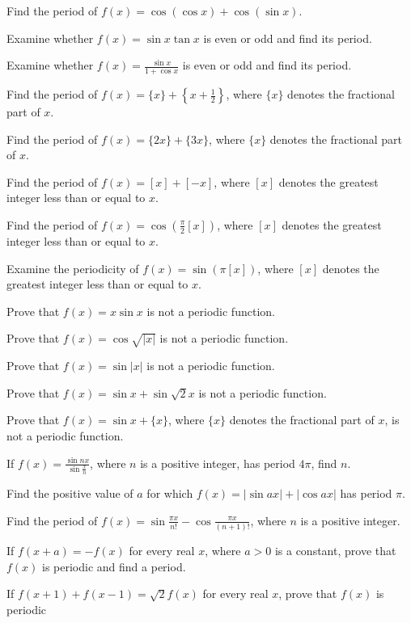 \item Find the period of $f(x) = \cos(\cos x) + \cos(\sin x)$.
\item Examine whether $f(x) = \sin x\tan x$ is even or odd and find its period.
\item Examine whether $f(x) = \frac{\sin x}{1 + \cos x}$ is even or odd and find its period.
\item Find the period of $f(x) = \{x\} + \left\{x + \frac{1}{2}\right\}$, where $\{x\}$ denotes the
  fractional part of $x$.
\item Find the period of $f(x) = \{2x\} + \{3x\}$, where $\{x\}$ denotes the fractional part of $x$.
\item Find the period of $f(x) = [x] + [-x]$, where $[x]$ denotes the greatest integer less than or
  equal to $x$.
\item Find the period of $f(x) = \cos\left(\frac{\pi}{2}[x]\right)$, where $[x]$ denotes the greatest
  integer less than or equal to $x$.
\item Examine the periodicity of $f(x) = \sin(\pi[x])$, where $[x]$ denotes the greatest integer
  less than or equal to $x$.
\item Prove that $f(x) = x\sin x$ is not a periodic function.
\item Prove that $f(x) = \cos\sqrt{|x|}$ is not a periodic function.
\item Prove that $f(x) = \sin|x|$ is not a periodic function.
\item Prove that $f(x) = \sin x + \sin\sqrt{2}x$ is not a periodic function.
\item Prove that $f(x) = \sin x + \{x\}$, where $\{x\}$ denotes the fractional part of $x$, is not a
  periodic function.
\item If $f(x) = \frac{\sin nx}{\sin\frac{x}{n}}$, where $n$ is a positive integer, has period
  $4\pi$, find $n$.
\item Find the positive value of $a$ for which $f(x) = |\sin ax| + |\cos ax|$ has period $\pi$.
\item Find the period of $f(x) = \sin\frac{\pi x}{n!} - \cos\frac{\pi x}{(n + 1)!}$, where $n$ is a
  positive integer.
\item If $f(x + a) = -f(x)$ for every real $x$, where $a > 0$ is a constant, prove that $f(x)$ is
  periodic and find a period.
\item If $f(x + 1) + f(x - 1) = \sqrt{2}f(x)$ for every real $x$, prove that $f(x)$ is periodic
